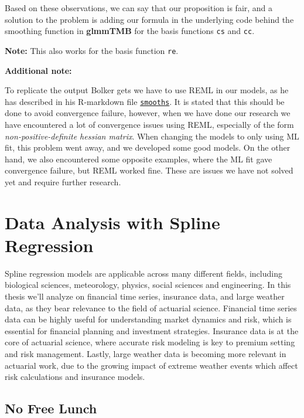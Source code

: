 \documentclass[12pt, twoside,hidelinks]{article}
\theoremstyle{definition}
\numberwithin{equation}{section}
\begin{document}
Based on these observations, we can say that our proposition is fair, and a solution to the problem is adding our formula in the underlying code behind the smoothing function in \textbf{glmmTMB} for the basis functions \texttt{cs} and \texttt{cc}.

\textbf{Note:} This also works for the basis function \texttt{re}.


\textbf{Additional note:}

To replicate the output Bolker gets we have to use REML in our models, as he has described in his R-markdown file \href{https://github.com/glmmTMB/glmmTMB/blob/master/notes/smooths.rmd}{\texttt{smooths}}. It is stated that this should be done to avoid convergence failure, however, when we have done our research we have encountered a lot of convergence issues using REML, especially of the form \textit{non-positive-definite hessian matrix}. 
\newline
When changing the models to only using ML fit, this problem went away, and we developed some good models. 
 On the other hand, we also encountered some opposite examples, where the ML fit gave convergence failure, but REML worked fine. These are issues we have not solved yet and require further research.
 
\section{Data Analysis with Spline Regression}\label{sec:analysis}

Spline regression models are applicable across many different fields, including biological sciences, meteorology, physics, social sciences and engineering. In this thesis we'll analyze on financial time series, insurance data, and large weather data, as they bear relevance to the field of actuarial science. Financial time series data can be highly useful for understanding market dynamics and risk, which is essential for financial planning and investment strategies. Insurance data is at the core of actuarial science, where accurate risk modeling is key to premium setting and risk management. Lastly, large weather data is becoming more relevant in actuarial work, due to the growing impact of extreme weather events which affect risk calculations and insurance models. 


\subsection{No Free Lunch}\label{nofreelunch}
\end{document}
